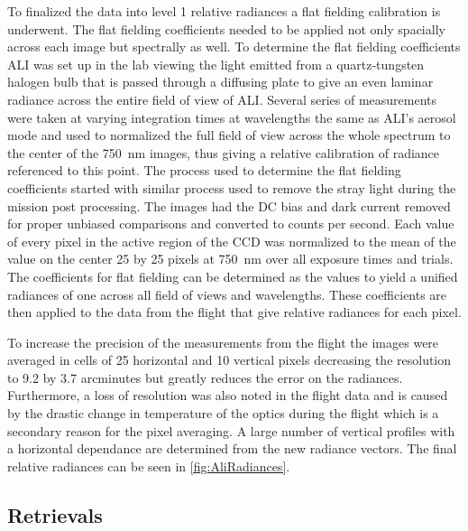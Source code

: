 \documentclass[12pt]{article}
\begin{document}
To finalized the data into level 1 relative radiances a flat fielding calibration is underwent. The flat fielding coefficients needed to be applied not only spacially across each image but spectrally as well. To determine the flat fielding coefficients ALI was set up in the lab viewing the light emitted from a quartz-tungsten halogen bulb that is passed through a diffusing plate to give an even laminar radiance across the entire field of view of ALI. Several series of measurements were taken at varying integration times at wavelengths the same as ALI's aerosol mode and used to normalized the full field of view across the whole spectrum to the center of the 750~nm images, thus giving a relative calibration of radiance referenced to this point. The process used to determine the flat fielding coefficients started with similar process used to remove the stray light during the mission post processing. The images had the DC bias and dark current removed for proper unbiased comparisons and converted to counts per second. Each value of every pixel in the active region of the CCD was normalized to the mean of the value on the center 25 by 25 pixels at 750~nm over all exposure times and trials. The coefficients for flat fielding can be determined as the values to yield a unified radiances of one across all field of views and wavelengths. These coefficients are then applied to the data from the flight that give relative radiances for each pixel.

To increase the precision of the measurements from the flight the images were averaged in cells of 25 horizontal and 10 vertical pixels decreasing the resolution to 9.2 by 3.7 arcminutes but greatly reduces the error on the radiances. Furthermore, a loss of resolution was also noted in the flight data and is caused by the drastic change in temperature of the optics during the flight which is a secondary reason for the pixel averaging. A large number of vertical profiles with a horizontal dependance are determined from the new radiance vectors. The final relative radiances can be seen in \autoref{fig:AliRadiances}.

\subsection{Retrievals}
\end{document}
